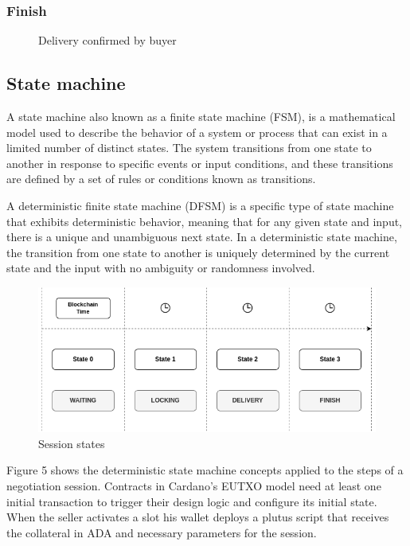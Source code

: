 \documentclass[12pt]{article}
\begin{document}
\subsubsection { Finish }

\begin{figure}[ht]
  \centering
  
  \caption{Delivery confirmed by buyer}
  \label{fig:delivered}
\end{figure}




\subsection { State machine }

A state machine also known as a finite state machine (FSM), is a mathematical model used to describe the behavior of a system or process that can exist in a limited number of distinct states. The system transitions from one state to another in response to specific events or input conditions, and these transitions are defined by a set of rules or conditions known as transitions.

A deterministic finite state machine (DFSM) is a specific type of state machine that exhibits deterministic behavior, meaning that for any given state and input, there is a unique and unambiguous next state. In a deterministic state machine, the transition from one state to another is uniquely determined by the current state and the input with no ambiguity or randomness involved.

\begin{figure}[ht]
  \centering
  \includegraphics[width=1\textwidth]{machine.png}
  \caption{Session states}
  \label{fig:States}
\end{figure}

Figure 5 shows the deterministic state machine concepts applied to the steps of a negotiation session. Contracts in Cardano's EUTXO model need at least one initial transaction to trigger their design logic and configure its initial state. When the seller activates a slot his wallet deploys a plutus script that receives the collateral in ADA and necessary parameters for the session. 
\\
\end{document}
